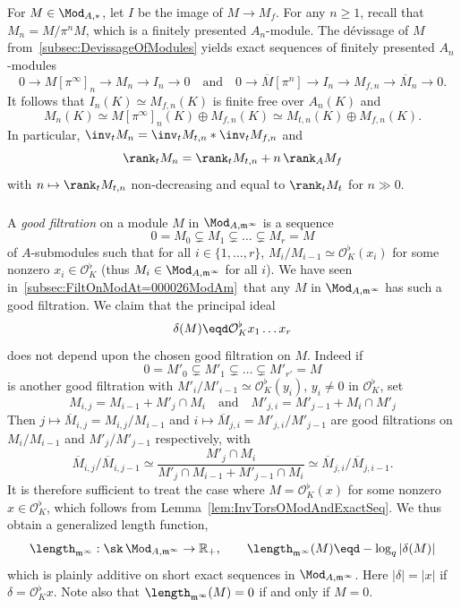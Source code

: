 For $M\in\Mod_{A,\ast}$, let $I$ be the image of $M\rightarrow M_{f}$. For any $n\geq1$, recall that $M_{n}=M/\pi^{n}M$, which is a finitely presented $A_{n}$-module. The d\'evissage of $M$ from~\ref{subsec:DevissageOfModules} yields exact sequences of finitely presented $A_{n}$-modules
\[
0\rightarrow M[\pi^{\infty}]_{n}\rightarrow M_{n}\rightarrow I_{n}\rightarrow0\quad\text{and}\quad0\rightarrow\overline{M}[\pi^{n}]\rightarrow I_{n}\rightarrow M_{f,n}\rightarrow\overline{M}_{n}\rightarrow0.
\]
It follows that $I_{n}(K)\simeq M_{f,n}(K)$ is finite free over $A_{n}(K)$ and
\[
M_{n}(K)\simeq M[\pi^{\infty}]_{n}(K)\oplus M_{f,n}(K)\simeq M_{t,n}(K)\oplus M_{f,n}(K).
\]
In particular, $\inv_{t}M_{n}=\inv_{t}M_{t,n}\ast\inv_{t}M_{f,n}$ and
\[
\rank_{t}M_{n}=\rank_{t}M_{t,n}+n\,\rank_{A}M_{f}
\]
with $n\mapsto\rank_{t}M_{t,n}$ non-decreasing and equal to $\rank_{t}M_{t}$ for $n\gg0$.

\subsubsection{}\label{subsec:defdegonModminfty}

A \emph{good filtration} on a module $M$ in $\Mod_{A,\mathfrak{m}^{\infty}}$ is a sequence
\[
0=M_{0}\subsetneq M_{1}\subsetneq\dots\subsetneq M_{r}=M
\]
of $A$-submodules such that for all $i\in\{1,\dots,r\}$, $M_{i}/M_{i-1}\simeq\mathcal{O}_{K}^{\flat}(x_{i})$ for some nonzero $x_{i}\in\mathcal{O}_{K}^{\flat}$ (thus $M_{i}\in\Mod_{A,\mathfrak{m}^{\infty}}$ for all $i$). We have seen in~\ref{subsec:FiltOnModAt=000026ModAm}~that any $M$ in $\Mod_{A,\mathfrak{m}^{\infty}}$ has such a good filtration. We claim that the principal ideal
\[
\delta(M)\eqd\mathcal{O}_{K}^{\flat}x_{1}\dots x_{r}
\]
does not depend upon the chosen good filtration on $M$. Indeed if
\[
0=M'_{0}\subsetneq M'_{1}\subsetneq\dots\subsetneq M'_{r'}=M
\]
is another good filtration with $M'_{i}/M'_{i-1}\simeq\mathcal{O}_{K}^{\flat}(y_{i})$, $y_{i}\neq0$ in $\mathcal{O}_{K}^{\flat}$, set
\[
M_{i,j}=M_{i-1}+M'_{j}\cap M_{i}\quad\text{and}\quad M'_{j,i}=M'_{j-1}+M_{i}\cap M'_{j}
\]
Then $j\mapsto\overline{M}_{i,j}=M_{i,j}/M_{i-1}$ and $i\mapsto\overline{M}_{j,i}=M'_{j,i}/M'_{j-1}$ are good filtrations on $M_{i}/M_{i-1}$ and $M'_{j}/M'_{j-1}$ respectively, with
\[
\overline{M}_{i,j}/\overline{M}_{i,j-1}\simeq\frac{M'_{j}\cap M_{i}}{M'_{j}\cap M_{i-1}+M'_{j-1}\cap M_{i}}\simeq\overline{M}_{j,i}/\overline{M}_{j,i-1}.
\]
It is therefore sufficient to treat the case where $M=\mathcal{O}_{K}^{\flat}(x)$ for some nonzero $x\in\mathcal{O}_{K}^{\flat}$, which follows from Lemma~\ref{lem:InvTorsOModAndExactSeq}. We thus obtain a generalized length function,
\[
\length_{\mathfrak{m}^{\infty}}:\sk\,\Mod_{A,\mathfrak{m}^{\infty}}\rightarrow\mathbb{R}_{+},\qquad\length_{\mathfrak{m}^{\infty}}(M)\eqd-\log_{q}\left|\delta(M)\right|
\]
which is plainly additive on short exact sequences in $\Mod_{A,\mathfrak{m}^{\infty}}$. Here $\left|\delta\right|=\left|x\right|$ if $\delta=\mathcal{O}_{K}^{\flat}x$. Note also that $\length_{\mathfrak{m}^{\infty}}(M)=0$ if and only if $M=0$.

